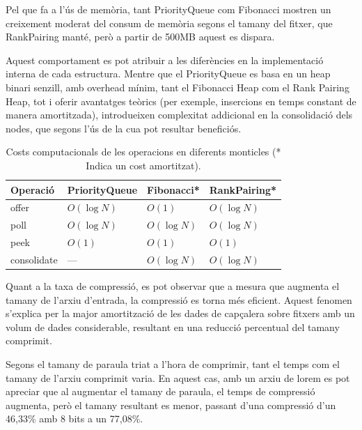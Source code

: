 \documentclass{ieeetj}
\begin{document}
Pel que fa a l'ús de memòria, tant PriorityQueue com Fibonacci mostren un creixement moderat del consum de memòria segons el tamany del fitxer, que RankPairing manté, però a partir de 500MB aquest es dispara. \newline

Aquest comportament es pot atribuir a les diferències en la implementació interna de cada estructura. Mentre que el PriorityQueue es basa en un heap binari senzill, amb overhead mínim, tant el Fibonacci Heap com el Rank Pairing Heap, tot i oferir avantatges teòrics (per exemple, insercions en temps constant de manera amortitzada), introdueixen complexitat addicional en la consolidació dels nodes, que segons l'ús de la cua pot resultar beneficiós. 

\begin{table}[h]
    \centering
    \begin{tabular}{|l|l|l|l|}
        \hline
        \textbf{Operació} & \textbf{PriorityQueue} & \textbf{Fibonacci*} & \textbf{RankPairing*} \\
        \hline
        offer      & \( O(\log N) \) & \( O(1) \) & \( O(\log N) \) \\
        poll       & \( O(\log N) \) & \( O(\log N) \) & \( O(\log N) \) \\
        peek       & \( O(1) \) & \( O(1) \) & \( O(1) \) \\
        consolidate & — & \( O(\log N) \) & \( O(\log N) \) \\
        \hline
    \end{tabular}
     \vspace{2mm}
    \caption{Costs computacionals de les operacions en diferents monticles (* Indica un cost amortitzat).}

\end{table}


Quant a la taxa de compressió, es pot observar que a mesura que augmenta el tamany de l'arxiu d'entrada, la compressió es torna més eficient. Aquest fenomen s'explica per la major amortització de les dades de capçalera sobre fitxers amb un volum de dades considerable, resultant en una reducció percentual del tamany comprimit.\newline

Segons el tamany de paraula triat a l'hora de comprimir, tant el temps com el tamany de l'arxiu comprimit varia. En aquest cas, amb un arxiu de lorem es pot apreciar que al augmentar el tamany de paraula, el temps de compressió augmenta, però el tamany resultant es menor, passant d'una compressió d'un 46,33\% amb 8 bits a un 77,08\%.\newline
\end{document}

